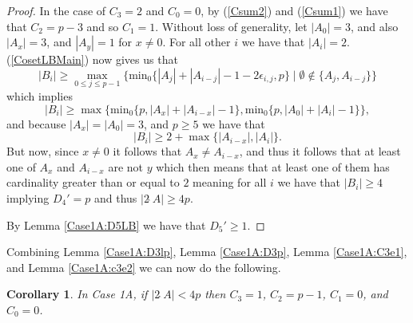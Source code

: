\documentclass[a4paper, 12pt]{article}\usepackage[english]{babel}
\newtheorem{cor}[thm]{Corollary}
\newcommand{\minz}{\mathrm{min}_0}
\newcommand{\<}{\langle}
\begin{document}
\begin{proof}
    In the case of $C_3=2$ and $C_0=0$, by (\ref{Csum2}) and (\ref{Csum1}) we have that $C_2=p-3$ and so $C_1=1$. Without loss of generality, let $|A_0|=3$, and also $|A_x|=3$, and $|A_y|=1$ for $x\neq 0$. For all other $i$ we have that $|A_i|=2$. (\ref{CosetLBMain}) now gives us that \[|B_i|\geq \max_{0\leq j\leq p-1}\{\mathrm{min}_0\{|A_j|+|A_{i-j}|-1-2\epsilon_{i,j},p\}\mid \emptyset\not\in \{A_j,A_{i-j} \}\}\]
    which implies
    \[|B_i|\geq \max\{\minz\{p,|A_x|+|A_{i-x}|-1\},\minz\{p,|A_0|+|A_{i}|-1\}\},\] and because $|A_x|=|A_0|=3$, and $p\geq 5$ we have that \[|B_i|\geq 2+\max\{|A_{i-x}|,|A_{i}|\}.\]  But now, since $x\neq 0$ it follows that $A_{x}\neq A_{i-x}$, and thus it follows that at least one of $A_x$ and $A_{i-x}$ are not $y$ which then means that at least one of them has cardinality greater than or equal to $2$ meaning for all $i$ we have that $|B_i|\geq 4$ implying $D_4'=p$ and thus $|2\hat{\;}A|\geq 4p$.
    
    
    
    By Lemma \ref{Case1A:D5LB} we have that $D_5'\geq 1$.
\end{proof}
Combining Lemma \ref{Case1A:D3lp}, Lemma \ref{Case1A:D3p}, Lemma \ref{Case1A:C3e1}, and Lemma \ref{Case1A:c3e2} we can now do the following.
\begin{cor}
In Case 1A, if $|2\hat{\;}A|<4p$ then $C_3=1$, $C_2=p-1$, $C_1=0$, and $C_0=0$.
\end{cor}
\end{document}
